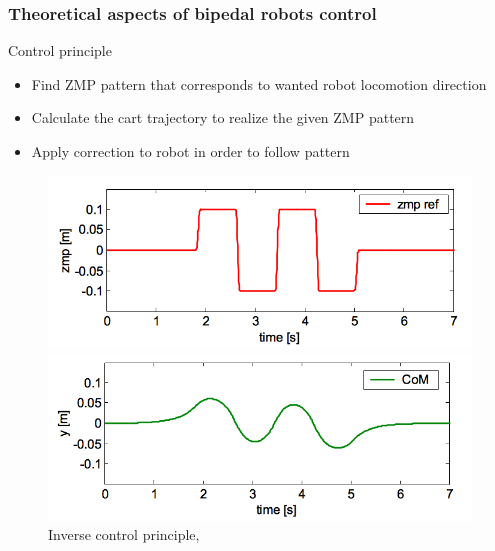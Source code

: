 \documentclass{beamer}
\begin{document}
\begin{frame}
	\frametitle{Theoretical aspects of bipedal robots control}
	\begin{block}{Control principle}
		\begin{itemize}
			\item
			Find ZMP pattern that corresponds to wanted robot locomotion direction
			\item
			Calculate the cart trajectory to realize the given ZMP pattern
			\item
			Apply correction to robot in order to follow pattern
		\end{itemize}
	\end{block}
	
	\begin{figure}[h!]
		\begin{minipage}[H]{\linewidth}
			\centering
			\includegraphics[width=0.35\linewidth]{presentation_images/13}
		\end{minipage}
		\begin{minipage}[H]{\linewidth}
			\centering
			\includegraphics[width=0.35\linewidth]{presentation_images/14}
		\end{minipage}
		\caption{Inverse control principle, \cite{kajita2003biped}}
	\end{figure}
\end{frame}

\end{document}
